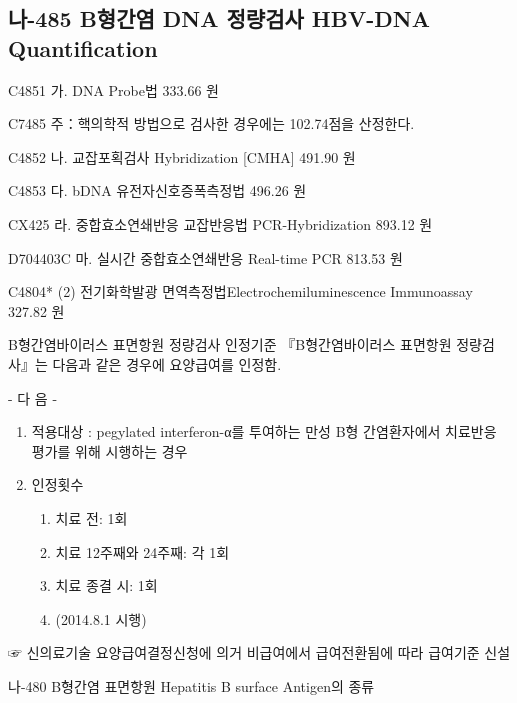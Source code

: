 \subsection{나-485 B형간염 DNA 정량검사 HBV-DNA Quantification}
C4851 가. DNA Probe법 333.66  원 \par
C7485 주：핵의학적 방법으로 검사한 경우에는 102.74점을 산정한다.\par
C4852 나. 교잡포획검사 Hybridization [CMHA] 491.90  원 \par
C4853 다. bDNA 유전자신호증폭측정법 496.26  원\par
CX425 라. 중합효소연쇄반응 교잡반응법 PCR-Hybridization 893.12  원\par
D704403C 마. 실시간 중합효소연쇄반응 Real-time PCR 813.53  원\par
C4804* (2) 전기화학발광 면역측정법Electrochemiluminescence Immunoassay 327.82  원 \par

\begin{commentbox}{B형간염바이러스 표면항원 정량검사 인정기준}
『B형간염바이러스 표면항원 정량검사』는 다음과 같은 경우에 요양급여를 인정함. \par
- 다 음 -
\begin{enumerate}[가.]\tightlist
\item 적용대상 : pegylated interferon-α를 투여하는 만성 B형 간염환자에서 치료반응 평가를 위해 시행하는 경우
\item 인정횟수
	\begin{enumerate}[1)]\tightlist
	\item 치료 전: 1회
	\item 치료 12주째와 24주째: 각 1회
	\item 치료 종결 시: 1회
	\item (2014.8.1 시행)
  	\end{enumerate}
\end{enumerate}  	
☞ 신의료기술 요양급여결정신청에 의거 비급여에서 급여전환됨에 따라 급여기준 신설
\end{commentbox}

나-480 B형간염 표면항원 Hepatitis B surface Antigen의 종류\par

